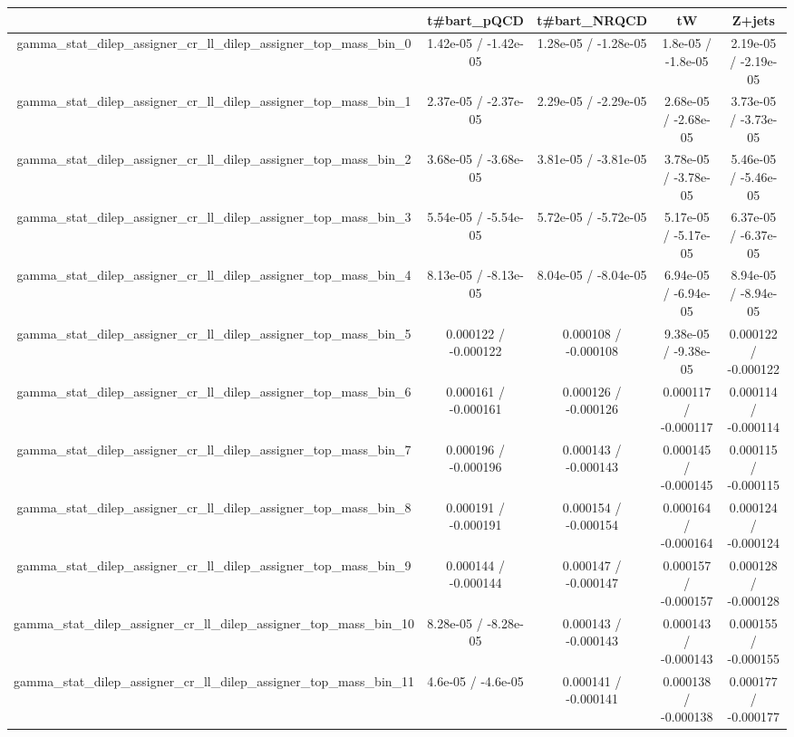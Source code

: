 \documentclass[10pt]{article}
\begin{document}
\begin{table}[htbp]
\begin{center}
\begin{tabular}{|c|c|c|c|c|}
\hline 
      & t#bar{t}_{pQCD}      & t#bar{t}_{NRQCD}      & tW      & Z+jets \\ 
\hline 
  gamma_stat_dilep_assigner_cr_ll_dilep_assigner_top_mass_bin_0 & 1.42e-05 / -1.42e-05 & 1.28e-05 / -1.28e-05 & 1.8e-05 / -1.8e-05 & 2.19e-05 / -2.19e-05 \\ 
  gamma_stat_dilep_assigner_cr_ll_dilep_assigner_top_mass_bin_1 & 2.37e-05 / -2.37e-05 & 2.29e-05 / -2.29e-05 & 2.68e-05 / -2.68e-05 & 3.73e-05 / -3.73e-05 \\ 
  gamma_stat_dilep_assigner_cr_ll_dilep_assigner_top_mass_bin_2 & 3.68e-05 / -3.68e-05 & 3.81e-05 / -3.81e-05 & 3.78e-05 / -3.78e-05 & 5.46e-05 / -5.46e-05 \\ 
  gamma_stat_dilep_assigner_cr_ll_dilep_assigner_top_mass_bin_3 & 5.54e-05 / -5.54e-05 & 5.72e-05 / -5.72e-05 & 5.17e-05 / -5.17e-05 & 6.37e-05 / -6.37e-05 \\ 
  gamma_stat_dilep_assigner_cr_ll_dilep_assigner_top_mass_bin_4 & 8.13e-05 / -8.13e-05 & 8.04e-05 / -8.04e-05 & 6.94e-05 / -6.94e-05 & 8.94e-05 / -8.94e-05 \\ 
  gamma_stat_dilep_assigner_cr_ll_dilep_assigner_top_mass_bin_5 & 0.000122 / -0.000122 & 0.000108 / -0.000108 & 9.38e-05 / -9.38e-05 & 0.000122 / -0.000122 \\ 
  gamma_stat_dilep_assigner_cr_ll_dilep_assigner_top_mass_bin_6 & 0.000161 / -0.000161 & 0.000126 / -0.000126 & 0.000117 / -0.000117 & 0.000114 / -0.000114 \\ 
  gamma_stat_dilep_assigner_cr_ll_dilep_assigner_top_mass_bin_7 & 0.000196 / -0.000196 & 0.000143 / -0.000143 & 0.000145 / -0.000145 & 0.000115 / -0.000115 \\ 
  gamma_stat_dilep_assigner_cr_ll_dilep_assigner_top_mass_bin_8 & 0.000191 / -0.000191 & 0.000154 / -0.000154 & 0.000164 / -0.000164 & 0.000124 / -0.000124 \\ 
  gamma_stat_dilep_assigner_cr_ll_dilep_assigner_top_mass_bin_9 & 0.000144 / -0.000144 & 0.000147 / -0.000147 & 0.000157 / -0.000157 & 0.000128 / -0.000128 \\ 
  gamma_stat_dilep_assigner_cr_ll_dilep_assigner_top_mass_bin_10 & 8.28e-05 / -8.28e-05 & 0.000143 / -0.000143 & 0.000143 / -0.000143 & 0.000155 / -0.000155 \\ 
  gamma_stat_dilep_assigner_cr_ll_dilep_assigner_top_mass_bin_11 & 4.6e-05 / -4.6e-05 & 0.000141 / -0.000141 & 0.000138 / -0.000138 & 0.000177 / -0.000177 \\ 

\end{tabular}
\end{center}
\end{table}
\end{document}
